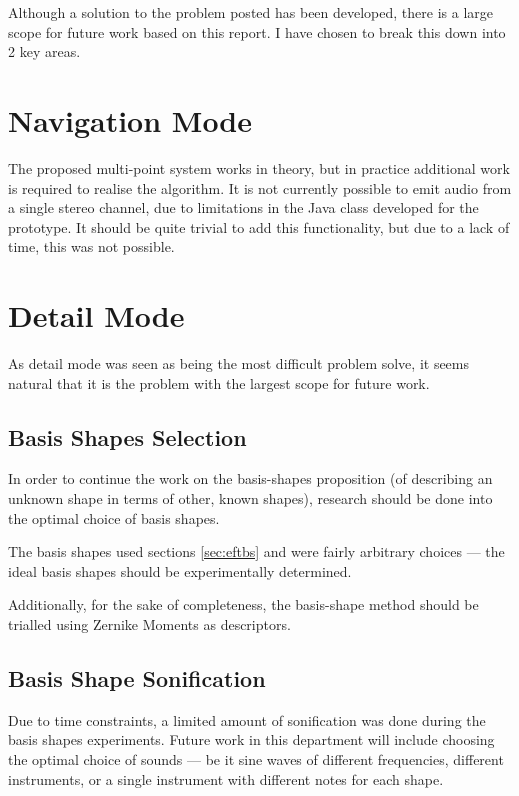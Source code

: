 Although a solution to the problem posted has been developed, there is a large scope for future work based on this report. I have chosen to break this down into 2 key areas.

\section{Navigation Mode}
The proposed multi-point system works in theory, but in practice additional work is required to realise the algorithm. It is not currently possible to emit audio from a single stereo channel, due to limitations in the Java class developed for the prototype. It should be quite trivial to add this functionality, but due to a lack of time, this was not possible.

\section{Detail Mode}
As detail mode was seen as being the most difficult problem solve, it seems natural that it is the problem with the largest scope for future work.

\subsection{Basis Shapes Selection}
In order to continue the work on the basis-shapes proposition (of describing an unknown shape in terms of other, known shapes), research should be done into the optimal choice of basis shapes.

The basis shapes used sections \ref{sec:eftbs} and were fairly arbitrary choices --- the ideal basis shapes should be experimentally determined.

Additionally, for the sake of completeness, the basis-shape method should be trialled using Zernike Moments as descriptors.

\subsection{Basis Shape Sonification}
Due to time constraints, a limited amount of sonification was done during the basis shapes experiments. Future work in this department will include choosing the optimal choice of sounds --- be it sine waves of different frequencies, different instruments, or a single instrument with different notes for each shape.
